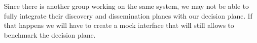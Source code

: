 Since there is another group working on the same system, we may not be able to fully integrate their discovery and dissemination planes with our decision plane. If that happens we will have to create a mock interface that will still allows to benchmark the decision plane.
